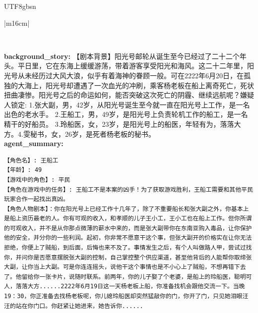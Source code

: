 \documentclass[11pt]{article}
\begin{document}
{\begin{CJK}{UTF8}{gbsn}
\begin{table}[ht!]
\begin{tabular}{|m{16cm}|}
\begin{minipage}[t]{\linewidth}
\begin{verbatim}
\end{verbatim}
\end{minipage} \\

\textbf{   background\_story:} \small【剧本背景】阳光号邮轮从诞生至今已经过了二十二个年头。平日里，它在东海上缓缓游荡，带着游客享受阳光和海风。这二十二年里，阳光号从未经历过大风大浪，似乎有着海神的眷顾一般。可在2222年6月20日，在孤独的大海上，阳光号却遭遇了一次血光的冲刷，乘客杨老板在船上离奇死亡，死状扭曲凄惨。阳光号之后的命运如何，能否突破这次死亡的阴霾、继续远航呢？嫌疑人锁定: 1.张大副，男，42岁，从阳光号诞生至今就一直在阳光号上工作，是一名出色的老水手。 2.王船工，男，49岁，是阳光号上负责轮机工作的船工，是一名精干的好船员。 3.玲船医，女，23岁，是阳光号上的船医，年轻有为，落落大方。4.雯秘书，女，26岁，是死者杨老板的秘书。 \\
 \textbf{   agent\_summary:} \\
\begin{minipage}[t]{\linewidth}
\small\begin{verbatim}
【角色名】: 王船工
【年龄】: 49
【游戏中的角色】: 平民
【角色在游戏中的任务】: 王船工不是本案的凶手！为了获取游戏胜利，王船工需要和其他平民玩家合作一起找出真凶。
【角色人物剧本】：你在阳光号上已经工作十几年了，除了不重要船长和张大副之外，你基本上是船上资历最老的人。你有可观的收入，和孝顺的儿子王小工，王小工也在船上工作。但你所谓的可观收入，并不是从你那点微薄的薪水中来的，而是张大副带你在东南亚购入毒品，让你保护他的安全，并分你的一些利润。起初，你非常不愿意干这个事，但张大副开的价格实在让你无法拒绝，你便上了贼船，到后面，后悔也来不及了。事情发生之后，有个人叫做路人甲，尝试过找你，并问你是否愿意摆脱张大副的控制，自己掌控整个供应渠道，甚至他背后的人能帮你取缔张大副，让你当上大副。可是你连连摇头，说他干这个事情也是不小心上了贼船，不想再错下去了。他留给你一张卡片，说随时联系。前两年，你的儿子娶了个老婆，是船上的玲船医，聪明可人，落落大方......2222年6月19日这一天杨老板上船，你准备找机会跟他交流一下。当晚19：30，你正准备去找杨老板呢，你儿媳玲船医却突然猛敲你的门，你开了门，只见她泪眼汪汪的站在你门口。你赶紧让她进来，她告诉你......


\end{verbatim}
\end{minipage}
\end{tabular}
\end{table}
\end{CJK}}
\end{document}
